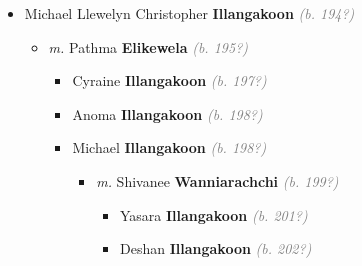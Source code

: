 \documentclass[10pt, openany]{book}
\begin{document}
\begin{itemize}
{\begin{itemize}
{\begin{itemize}
{\begin{itemize}
{\begin{itemize}
{\begin{itemize}
{\begin{itemize}
\item{\textit{m.} Devinka \textbf{Fernando} \textcolor{gray}{\textit{(b. 198?)}}   \label{couple:00001451:00001452} \begin{itemize}
\item{Kiyan \textbf{Illangakoon} \textcolor{gray}{\textit{(b. 201?)}}
 }
\item{Niran \textbf{Illangakoon} \textcolor{gray}{\textit{(b. 201?)}}
 }
\end{itemize}}
\end{itemize}
 }
\end{itemize}}
\end{itemize}
 }
\item{Michael Llewelyn Christopher \textbf{Illangakoon} \textcolor{gray}{\textit{(b. 194?)}}
\begin{itemize}
\item{\textit{m.} Pathma \textbf{Elikewela} \textcolor{gray}{\textit{(b. 195?)}}   \label{couple:00001447:00001448} \begin{itemize}
\item{Cyraine \textbf{Illangakoon} \textcolor{gray}{\textit{(b. 197?)}}
 }
\item{Anoma \textbf{Illangakoon} \textcolor{gray}{\textit{(b. 198?)}}
 }
\item{Michael \textbf{Illangakoon} \textcolor{gray}{\textit{(b. 198?)}}
\begin{itemize}
\item{\textit{m.} Shivanee \textbf{Wanniarachchi} \textcolor{gray}{\textit{(b. 199?)}}   \label{couple:00001443:00001444} \begin{itemize}
\item{Yasara \textbf{Illangakoon} \textcolor{gray}{\textit{(b. 201?)}}
 }
\item{Deshan \textbf{Illangakoon} \textcolor{gray}{\textit{(b. 202?)}}
 }
\end{itemize}}
\end{itemize}
 }
\end{itemize}}
\end{itemize}
   }
\end{itemize}}
\end{itemize}
    }
\end{itemize}}
\end{itemize}
  
\end{document}
